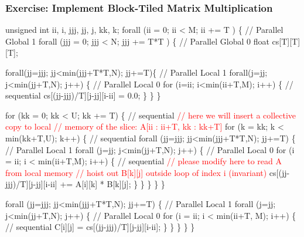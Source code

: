\documentclass{beamer}
\newcommand{\red}[1]{\textcolor{Red}{{#1}}}
\renewcommand{\emph}[1]{\textcolor{CosGreen}{ #1}}
\newcommand{\emp}[1]{\textcolor{DikuRed}{ #1}}
\begin{document}
\begin{frame}[fragile,t]
  \frametitle{Exercise: Implement Block-Tiled Matrix Multiplication}

\begin{colorcode}[fontsize=\tiny]
unsigned int ii, i, jjj, jj, j, kk, k;
\emp{forall (ii = 0; ii < M; ii += T ) \{           // Parallel Global 1}
  \emp{forall (jjj = 0; jjj < N; jjj += T*T ) \{    // Parallel Global 0}
    float cs[T][T][T];

    \emph{forall(jj=jjj; jj<min(jjj+T*T,N); jj+=T)\{ // Parallel Local 1}
      \emph{forall(j=jj; j<min(jj+T,N); j++) \{      // Parallel Local 0}
        for (i=ii; i<min(ii+T,M); i++) \{      // sequential
          cs[(jj-jjj)/T][j-jj][i-ii] = 0.0;
    \} \} \}

    for (kk = 0; kk < U; kk += T) \{                 // sequential
      \red{// here we will insert a collective copy to local}
      \red{// memory of the slice: A[ii : ii+T, kk : kk+T]}
      for (k = kk; k < min(kk+T,U); k++) \{          // sequential
        \emph{forall (jj=jjj; jj<min(jjj+T*T,N); jj+=T) \{ // Parallel Local 1}
          \emph{forall (j=jj; j<min(jj+T,N); j++) \{       // Parallel Local 0}
            for (i = ii; i < min(ii+T,M); i++) \{    // sequential
              \red{// please modify here to read A from local memory}
              \red{// hoist out B[k][j] outside loop of index i (invariant)}
              cs[(jj-jjj)/T][j-jj][i-ii] += A[i][k] * B[k][j];
    \} \} \} \} \}

    \emp{forall (jj=jjj; jj<min(jjj+T*T,N); jj+=T) \{     // Parallel Local 1}
      \emp{forall (j=jj; j<min(jj+T,N); j++) \{           // Parallel Local 0}
        for (i = ii; i < min(ii+T, M); i++) \{       // sequential
          C[i][j] = cs[(jj-jjj)/T][j-jj][i-ii];
    \} \} \}
\} \}
\end{colorcode}
\end{frame}
\end{document}
